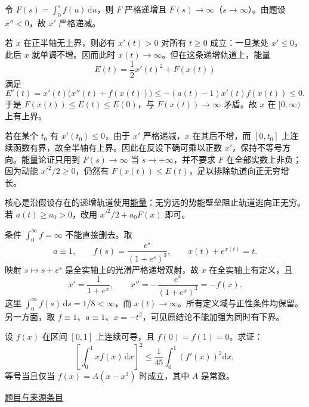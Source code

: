 \documentclass[12pt,fontset=fandol]{ctexart}
\begin{document}
\begin{solve}\label{ans:fin06-lo:8}

令 $F(s)=\int_0^sf(u)\,\mathrm du$，则 $F$ 严格递增且 $F(s)\to\infty$（$s\to\infty$）。由题设 $x''<0$，故 $x'$ 严格递减。

若 $x$ 在正半轴无上界，则必有 $x'(t)>0$ 对所有 $t\ge0$ 成立：一旦某处 $x'\le0$，此后 $x$ 就单调不增。因而此时 $x(t)\to\infty$。但在这条递增轨道上，能量
\[
E(t)=\frac12x'(t)^2+F(x(t))
\]
满足
\[
E'(t)=x'(t)\bigl(x''(t)+f(x(t))\bigr)
\le-(a(t)-1)x'(t)f(x(t))\le0.
\]
于是 $F(x(t))\le E(t)\le E(0)$，与 $F(x(t))\to\infty$ 矛盾。故 $x$ 在 $[0,\infty)$ 上有上界。

若在某个 $t_0$ 有 $x'(t_0)\le0$，由于 $x'$ 严格递减，$x$ 在其后不增，而 $[0,t_0]$ 上连续函数有界，故全半轴有上界。因此在反设下确可乘以正数 $x'$，保持不等号方向。能量论证只用到 $F(s)\to\infty$ 当 $s\to+\infty$，并不要求 $F$ 在全部实数上非负；因为动能 $x'^2/2\ge0$，仍然有 $F(x(t))\le E(t)$，足以排除轨道向正无穷增长。

\end{solve}

\begin{remark}[方法与条件]核心是沿假设存在的递增轨道使用\hyperref[app:dynamics-energy]{能量}：无穷远的势能壁垒阻止轨道逃向正无穷。若 $a(t)\ge a_0>0$，改用 $x'^2/2+a_0F(x)$ 即可。

条件 $\int_0^\infty f=\infty$ 不能直接删去。取
\[
a\equiv1,\qquad f(s)=\frac{e^s}{(1+e^s)^3},
\qquad x(t)+e^{x(t)}=t.
\]
映射 $s\mapsto s+e^s$ 是全实轴上的光滑严格递增双射，故 $x$ 在全实轴上有定义，且
\[
x'=\frac1{1+e^x},\qquad
x''=-\frac{e^x}{(1+e^x)^3}=-f(x).
\]
这里 $\int_0^\infty f(s)\,\mathrm ds=1/8<\infty$，而 $x(t)\to\infty$。所有定义域与正性条件均保留。另一方面，取 $f\equiv1$、$a\equiv1$、$x=-t^2$，可见原结论不能加强为同时有下界。\end{remark}

\begin{example}\label{ex:fin06-lo:9}\label{pr:fin06-lo:9}

设 $f(x)$ 在区间 $[0,1]$ 上连续可导，且 $f(0)=f(1)=0$。求证：
\[
\left[\int_0^1 xf(x)\,\mathrm{d}x\right]^2\le\frac{1}{45}\int_0^1\left(f'(x)\right)^2\mathrm{d}x,
\]
等号当且仅当 $f(x)=A\left(x-x^3\right)$ 时成立，其中 $A$ 是常数。

\par\href{https://github.com/lzxcr/cmc-mathematics/blob/64916fa1fdbc3e444a652eca204d5669058ee321/src/problems/finals/06/09.md}{题目与来源条目}

\end{example}
\end{document}
